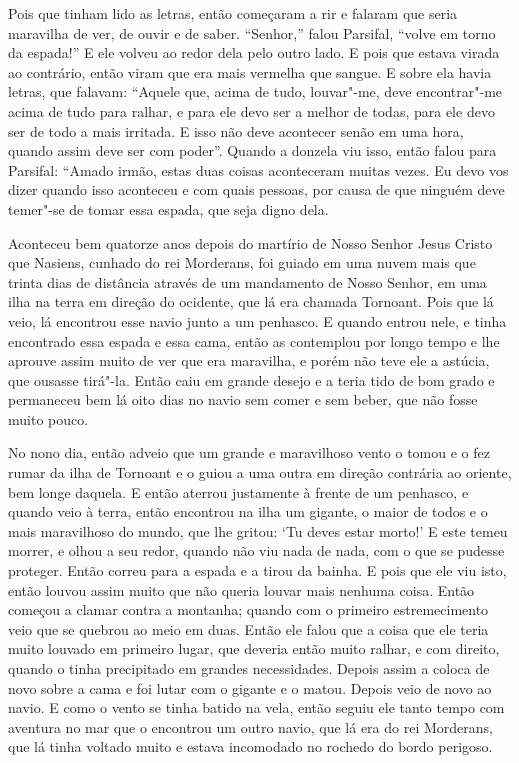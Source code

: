  Pois que tinham lido as letras, então começaram a rir e falaram que seria
maravilha de ver, de ouvir e de saber. “Senhor,” falou Parsifal, “volve em
torno da espada!” E ele volveu ao redor dela pelo outro lado. E pois que
estava virada ao contrário, então viram que era mais vermelha que sangue. E
sobre ela havia letras, que falavam: “Aquele que, acima de tudo, louvar"-me,
deve encontrar"-me acima de tudo para ralhar, e para ele devo ser a melhor de
todas, para ele devo ser de todo a mais irritada. E isso não deve acontecer
senão em uma hora, quando assim deve ser com poder”. Quando a donzela viu isso,
então falou para Parsifal: “Amado irmão, estas duas coisas aconteceram muitas
vezes. Eu devo vos dizer quando isso aconteceu e com quais pessoas, por causa
de que ninguém deve temer"-se de tomar essa espada, que seja digno dela.

 Aconteceu bem quatorze anos depois do martírio de Nosso Senhor Jesus Cristo que
Nasiens, cunhado do rei Morderans, foi guiado em uma nuvem mais que trinta dias
de distância através de um mandamento de Nosso Senhor, em uma ilha na terra em
direção do ocidente, que lá era chamada Tornoant. Pois que lá veio, lá
encontrou esse navio junto a um penhasco. E quando entrou nele, e tinha
encontrado essa espada e essa cama, então as contemplou por longo tempo e lhe
aprouve assim muito de ver que era maravilha, e porém não teve ele a astúcia,
que ousasse tirá"-la. Então caiu em grande desejo e a teria tido de bom grado e
permaneceu bem lá oito dias no navio sem comer e sem beber, que não fosse muito
pouco.

No nono dia, então adveio que um grande e maravilhoso vento o tomou e o fez
rumar da ilha de Tornoant e o guiou a uma outra em direção contrária ao
oriente, bem longe daquela. E então aterrou justamente à frente de um penhasco,
e quando veio à terra, então encontrou na ilha um gigante, o maior de todos e o
mais maravilhoso do mundo, que lhe gritou: ‘Tu deves estar morto!’ E este
temeu morrer, e olhou a seu redor, quando não viu nada de nada, com o que se
pudesse proteger. Então correu para a espada e a tirou da bainha. E pois que
ele viu isto, então louvou assim muito que não queria louvar mais nenhuma
coisa. Então começou a clamar contra a montanha; quando com o primeiro
estremecimento veio que se quebrou ao meio em duas. Então ele falou que a coisa
que ele teria muito louvado em primeiro lugar, que deveria então muito ralhar,
e com direito, quando o tinha precipitado em grandes necessidades. Depois assim
a coloca de novo sobre a cama e foi lutar com o gigante e o matou. Depois veio
de novo ao navio. E como o vento se tinha batido na vela, então seguiu ele
tanto tempo com aventura no mar que o encontrou um outro navio, que lá era do
rei Morderans, que lá tinha voltado muito e estava incomodado no rochedo do
bordo perigoso. 

